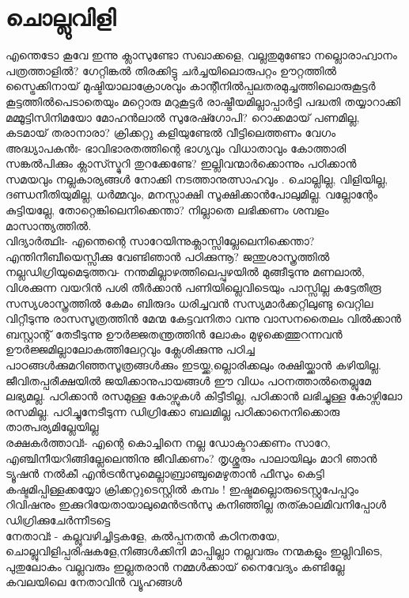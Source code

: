 \section{ചൊല്ലുവിളി}
\obeylines
\noindent
എന്തെടോ കൂവേ  ഇന്നു ക്ലാസുണ്ടോ സഖാക്കളെ,
വല്ലതുമുണ്ടോ നല്ലൊരാഹ്വാനം പത്രത്താളിൽ? 
ഗേറ്റിങ്കൽ തിരക്കിട്ടു ചർച്ചയിലൊരുപറ്റം  
ഊറ്റത്തിൽ സ്ട്രൈക്കിനായ് മുഷ്ടിയാലാക്രോശവും 
കാന്റീനിൽപ്പലതരമുച്ചത്തിലൊരുകൂട്ടർ  
കൂട്ടത്തിൽപെടാതെയും മറ്റൊരു മറുകൂട്ടർ 
രാഷ്ട്രീയമില്ലാപ്പാർട്ടി പദ്ധതി തയ്യാറാക്കി  
മമ്മൂട്ടിസിനിമയോ മോഹൻലാൽ സുരേഷ്ഗോപി? 
റൊക്കമായ് പണമില്ല, കടമായ് തരാനാരാ? 
ക്രിക്കറ്റു കളിയുണ്ടേൽ വീട്ടിലെത്തണം വേഗം  \\
അദ്ധ്യാപകൻഃ-  
ഭാവിഭാരതത്തിന്റെ ഭാഗ്യവും വിധാതാവും
കോത്താരി സങ്കൽപിക്കും ക്ലാസ്സ്മുറി തുറക്കേണ്ടേ? 
ഇല്ലിവന്മാർക്കൊന്നും പഠിക്കാൻ സമയവും  
നല്ലകാര്യങ്ങൾ നോക്കി നടത്താനുത്സാഹവും .
ചൊല്ലില്ല, വിളിയില്ല, ദണ്ഡനീതിയുമില്ല, 
ധർമ്മവും, മനസ്സാക്ഷി സൂക്ഷിക്കാൻപോലുമില്ല. 
വല്ലോന്റേം കുട്ടിയല്ലേ, തോറ്റെങ്കിലെനിക്കെന്താ? 
നില്ലാതെ ലഭിക്കണം ശമ്പളം മാസാന്ത്യത്തിൽ. \\
വിദ്യാർത്ഥിഃ- 
എന്തെന്റെ സാറേയിന്നുക്ലാസ്സില്ലേലെനിക്കെന്താ? 
എന്തിനീബീയെസ്സീക്കു വേണ്ടിഞാൻ പഠിക്കുന്നൂ? 
ജന്തുശാസ്ത്രത്തിൽ നല്ലഡിഗ്രിയുമെടുത്തവ- 
നന്തമില്ലാഴത്തിലെപ്പുഴയിൽ മുങ്ങീടുന്നു 
മണലാൽ, വിശക്കുന്ന വയറിൻ പശി തീർക്കാൻ 
പണിയില്ലെവിടെയും പാസ്സില്ല കട്ടേതീരൂ 
സസ്യശാസ്ത്രത്തിൽ കേമം ബിരുദം ധരിച്ചവൻ 
സസ്യമാർക്കറ്റിലുണ്ടു  വെറ്റില വിറ്റീടുന്നു 
രാസസൂത്രത്തിൻ മേന്മ കേട്ടവനിതാ വന്നു 
വാസനതൈലം വിൽക്കാൻ ബസ്റ്റാന്റ് തേടീടുന്നു 
ഊർജ്ജതന്ത്രത്തിൻ ലോകം മുഴുക്കെത്തുറന്നവൻ 
ഊർജ്ജമില്ലാലോകത്തിലേറ്റവും ക്ലേശിക്കുന്നു 
പഠിച്ച പാഠങ്ങൾക്കുമറിഞ്ഞസൂത്രങ്ങൾക്കും  
ഇടയ്ക്ക,ല്ലൊരിക്കലും രക്ഷിയ്ക്കാൻ കഴിയില്ല. 
ജീവിതപ്പരീക്ഷയിൽ ജയിക്കാനുപായങ്ങൾ 
ഈ വിധം പഠനത്താൽതെല്ലുമേ ലഭ്യമല്ല.
പഠിക്കാൻ രസമുള്ള കോഴ്സുകൾ കിട്ടീടില്ല,
പഠിക്കാൻ ലഭിച്ചുള്ള കോഴ്സിലോ രസമില്ല. 
പഠിച്ചുനേടീടുന്ന ഡിഗ്രിക്കോ ബലമില്ല 
പഠിക്കാനെനിക്കൊരു താത്പര്യമില്ലേയില്ല \\
രക്ഷകർത്താവ്ഃ- 
എന്റെ കൊച്ചിനെ നല്ല ഡോക്ടറാക്കണം സാറേ, 
എഞ്ചിനീയറിങ്ങില്ലേലെന്തിനു ജീവിക്കണം? 
തൃശ്ശൂരും പാലായിലും മാറി ഞാൻ ട്യൂഷൻ നൽകീ 
എൻട്രൻസുമെല്ലാബ്രാഞ്ചുമെഴുതാൻ ഫീസും കെട്ടി 
കഷ്ടമിപ്പിള്ളക്കയ്യോ ക്രിക്കറ്റുടെസ്റ്റിൽ കമ്പം !
ഇഷ്ടമല്ലൊരുടെസ്റ്റുപേപ്പറും റിവിഷനും  
ഇക്കുറിയേതായാലുമെൻട്രൻസു കനിഞ്ഞില്ല 
തത്കാലമിവനിപ്പോൾ ഡിഗ്രിക്കുചേർന്നീടട്ടെ\\ 
നേതാവ്ഃ - 
കല്ലുവഴിച്ചിട്ടകളേ, കൽപ്പനതൻ കഠിനതയേ, 
ചൊല്ലുവിളിപ്പരിഷകളേ,നിങ്ങൾക്കിനി മാപ്പില്ലാ 
നല്ലവരും നന്മകളും ഇല്ലിവിടെ, പുതുലോകം 
വല്ലവരും ഇല്ലതരാൻ നമ്മൾക്കായ് നൈവേദ്യം  
കണ്ടില്ലേ കവലയിലെ നേതാവിൻ വ്യൂഹങ്ങൾ
